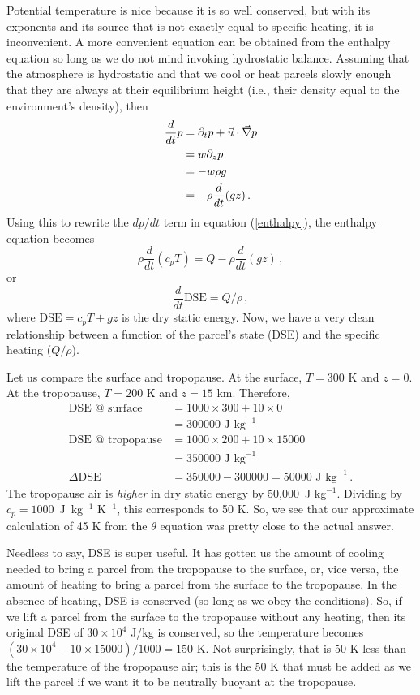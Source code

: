 \documentclass[12pt]{article}
\newcommand{\dse}{{\text{DSE}}}
\begin{document}
Potential temperature is nice because it is so well conserved, but with its exponents and its source that is not exactly equal to specific heating, it is inconvenient.  A more convenient equation can be obtained from the enthalpy equation so long as we do not mind invoking hydrostatic balance.  Assuming that the atmosphere is hydrostatic and that we cool or heat parcels slowly enough that they are always at their equilibrium height (i.e., their density equal to the environment's density), then
\begin{align}
\frac{d}{dt} p &= \partial_t p + \vec{u} \cdot {\vec{\nabla}} p \\
&= w \partial_z p \\
&= -w\rho g \\
&= -\rho \frac{d}{dt} (gz) \, .
\end{align}
Using this to rewrite the $dp/dt$ term in equation (\ref{enthalpy}), the enthalpy equation becomes
\[
\rho \frac{d}{dt} (c_p T) = Q - \rho \frac{d}{dt} (gz) \, ,
\]
or
\begin{equation}
\frac{d}{dt} \dse = Q/\rho \, , \label{dse}
\end{equation}
where $\dse{} = c_p T + gz$ is the dry static energy.  Now, we have a very clean relationship between a function of the parcel's state (DSE) and the specific heating ($Q/\rho$).


Let us compare the surface and tropopause.   At the surface, $T = 300$ K and $z = 0$.  At the tropopause, $T = 200$ K and $z = 15$ km.  Therefore,
\begin{align}
\dse \text{ @ surface} &= 1000 \times 300 + 10 \times 0 \\
&= \num{300000} \text{ J kg}^{-1} \\
\dse \text{ @ tropopause} &= 1000 \times 200 + 10 \times 15000\\
&= \num{350000} \text{ J kg}^{-1} \\
\Delta \dse &= \num{350000}-\num{300000} = \num{50000} \text{ J kg}^{-1} \, .
\end{align}
The tropopause air is {\it higher} in dry static energy by 50,000~J kg$^{-1}$.  Dividing by $c_p = 1000$~J~kg$^{-1}$ K$^{-1}$, this corresponds to 50 K.  So, we see that our approximate calculation of 45 K from the $\theta$ equation was pretty close to the actual answer.


Needless to say, DSE is super useful.  It has gotten us the amount of cooling needed to bring a parcel from the tropopause to the surface, or, vice versa, the amount of heating to bring a parcel from the surface to the tropopause.  In the absence of heating, DSE is conserved (so long as we obey the conditions).  So, if we lift a parcel from the surface to the tropopause without any heating, then its original DSE of $30 \times 10^4$ J/kg is conserved, so the temperature becomes $(30 \times 10^4 - 10 \times 15000)/1000 = 150$ K.  Not surprisingly, that is 50 K less than the temperature of the tropopause air; this is the 50 K that must be added as we lift the parcel if we want it to be neutrally buoyant at the tropopause.
\end{document}
